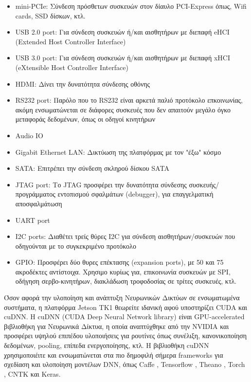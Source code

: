 \begin{itemize}
  \setlength\itemsep{0em}
  \item{mini-PCIe: Σύνδεση πρόσθετων συσκευών στον δίαυλο PCI-Express όπως, Wifi cards, SSD δίσκων, κτλ.}
  \item{USB 2.0 port: Για σύνδεση συσκευών ή/και αισθητήρων με διεπαφή eHCI (Extended Host Controller Interface)}
  \item{USB 3.0 port: Για σύνδεση συσκευών ή/και αισθητήρων με διεπαφή xHCI (eXtensible Host Controller Interface)}
  \item{HDMI: Δίνει την δυνατότητα σύνδεσης οθόνης}
  \item{RS232 port: Παρόλο που το RS232 είναι αρκετά παλιό προτόκολο επκοινωνίας, ακόμη ενσωματώνεται σε διάφορες συσκευές που δεν απαιτούν μεγάλο όγκο μεταφοράς δεδομένων, όπως οι οδηγοί κινητήρων}
  \item{Audio IO}
  \item{Gigabit Ethernet LAN: Δικτύωση της πλατφόρμας με τον "έξω" κόσμο}
  \item{SATA: Επιτρέπει την σύνδεση σκληρού δίσκου SATA}
  \item{JTAG port: Το JTAG προσφέρει την δυνατότητα σύνδεσης συσκευής/προγράμματος εντοπισμού σφαλμάτων (debugger), για επαγγελματική αποσφαλμάτωση}
  \item{UART port}
  \item{I2C ports: Διαθέτει τρείς θύρες I2C για σύνδεση αισθητήρων/συσκευών που οδηγούνται με το συγκεκριμένο προτόκολο}
  \item{GPIO: Προσφέρει δύο θυρες επέκτασης (expansion ports), με 50 και 75 ακροδέκτες αντίστοιχα. Χρησιμο κυρίως για, επικοινωνία συσκευών με SPI, οδήγηση σερβο-κινητήρων, διακλάδωση τροφοδοσίας σε τρίτες συσκευές, κτλ.}
\end{itemize}

Όσον αφορά την υλοποίηση και ανάπτυξη Νευρωνικών Δικτύων σε ενσωματωμένα συστήματα,
η πλατφόρμα Jetson TK1 θεωρείτε ιδανική αφού υποστηρίζει CUDA και cuDNN.
H cuDNN (CUDA Deep Neural Network library) είναι GPU-accelerated βιβλιοθήκη για Νευρωνικά Δίκτυα,
η οποία αναπτύχθηκε από την NVIDIA και προσφέρει υψηλού επιπέδου υλοποιήσεις για ρουτίνες όπως συνέλιξη, κανονικοποίηση δεδομένων, pooling, επίπεδα ενεργοποίησης, κτλ.
Η βιβλιοθήκη cuDNN χρησιμοποιέιτε και ενσωματώνεται στα πιο δημοφιλή σήμερα frameworks για σχεδίαση και υλοποίηση μοντέλων DNN,
όπως Caffe \cite{jia2014caffe}, Tensorflow \cite{DBLP:journals/corr/AbadiBCCDDDGIIK16},
Theano \cite{2016arXiv160502688full}\cite{bergstra+al:2010-scipy}\cite{Bastien-Theano-2012},
Torch \cite{collobert2002torch}\cite{collobert2011torch7}\cite{collobert2012implementing}, CNTΚ και Keras.


